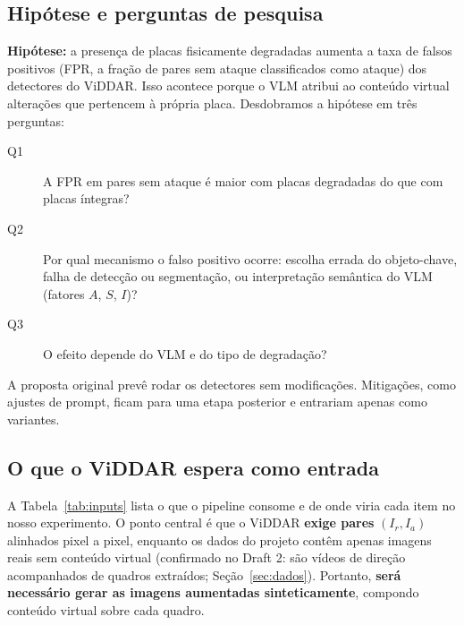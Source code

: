 \documentclass[journal,onecolumn]{IEEEtran}
\newcommand{\Ir}{I_r}
\newcommand{\Ia}{I_a}
\begin{document}
\subsection{Hipótese e perguntas de pesquisa}
\textbf{Hipótese:} a presença de placas fisicamente degradadas aumenta a taxa de falsos positivos
(FPR, a fração de pares sem ataque classificados como ataque) dos detectores do ViDDAR. Isso acontece
porque o VLM atribui ao conteúdo virtual alterações que pertencem à própria placa. Desdobramos a
hipótese em três perguntas:
\begin{description}
\item[Q1] A FPR em pares sem ataque é maior com placas degradadas do que com placas íntegras?
\item[Q2] Por qual mecanismo o falso positivo ocorre: escolha errada do objeto-chave, falha de
  detecção ou segmentação, ou interpretação semântica do VLM (fatores $A$, $S$, $I$)?
\item[Q3] O efeito depende do VLM e do tipo de degradação?
\end{description}
A proposta original prevê rodar os detectores sem modificações. Mitigações, como ajustes de prompt,
ficam para uma etapa posterior e entrariam apenas como variantes.

\subsection{O que o ViDDAR espera como entrada}
A Tabela~\ref{tab:inputs} lista o que o pipeline consome e de onde viria cada item no nosso
experimento. O ponto central é que o ViDDAR \textbf{exige pares} $(\Ir,\Ia)$ alinhados pixel a pixel,
enquanto os dados do projeto contêm apenas imagens reais sem conteúdo virtual (confirmado no Draft 2:
são vídeos de direção acompanhados de quadros extraídos; Seção~\ref{sec:dados}). Portanto,
\textbf{será necessário gerar as imagens aumentadas sinteticamente}, compondo conteúdo virtual sobre
cada quadro.
\end{document}
